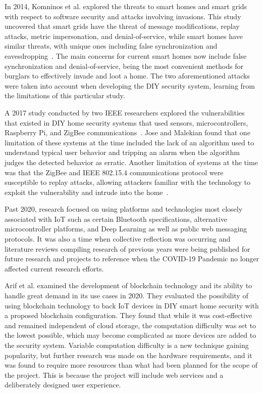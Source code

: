 In 2014, Komninos et al. explored the threats to smart homes and smart grids with respect to
software security and attacks involving invasions. This study uncovered that smart grids have
the threat of message modifications, replay attacks, metric impersonation, and
denial-of-service, while smart homes have similar threats, with unique ones including
false synchronization and eavesdropping~\cite{komninosEtAl2014}. The main concerns for current
smart homes now include false synchronization and denial-of-service, being the most convenient
methods for burglars to effectively invade and loot a home. The two aforementioned attacks
were taken into account when developing the DIY security system, learning from the limitations
of this particular study.

A 2017 study conducted by two IEEE researchers explored the vulnerabilities that existed
in DIY home security systems that used sensors, microcontrollers, Raspberry Pi, and ZigBee
communications~\cite{joseMalekian2017}. Jose and Malekian found that one limitation of these
systems at the time included the lack of an algorithm used to understand typical
user behavior and tripping an alarm when the algorithm judges the detected behavior as
erratic. Another limitation of systems at the time was that the ZigBee and IEEE 802.15.4
communications protocol were susceptible to replay attacks, allowing attackers familiar
with the technology to exploit the vulnerability and intrude
into the home~\cite{joseMalekian2017}.

Past 2020, research focused on using platforms and technologies most closely associated with
IoT such as certain Bluetooth specifications, alternative microcontroller platforms, and Deep
Learning as well as public web messaging protocols. It was also a time when collective
reflection was occurring and literature reviews compiling research of previous years were
being published for future research and projects to reference when the COVID-19 Pandemic no
longer affected current research efforts.

Arif et al. examined the development of blockchain technology and its ability to
handle great demand in its use cases in 2020. They evaluated the possibility of using
blockchain technology to back IoT devices in DIY smart home security with a proposed
blockchain configuration. They found that while it was cost-effective and remained
independent of cloud storage, the computation difficulty was set to the lowest possible,
which may become complicated as more devices are added to the security system.
\cite{arifEtAl_2020} Variable computation difficulty is a new technique gaining popularity,
but further research was made on the hardware requirements, and it was found to require more
resources than what had been planned for the scope of the project. This is because the
project will include web services and a deliberately designed user experience.

